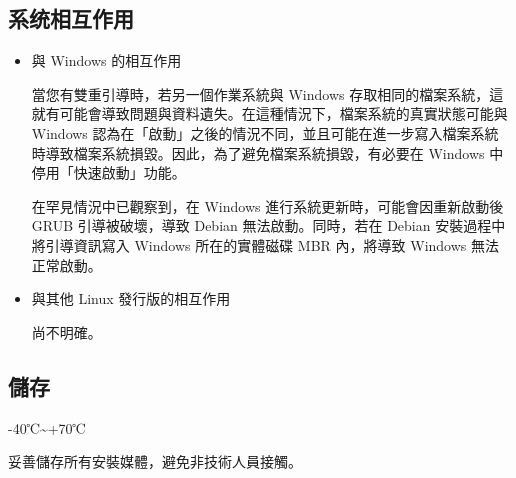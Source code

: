 \documentclass[UTF8]{article}
\begin{document}
\begin{multicols*}{3}


	 
	 


	\begin{tcolorbox}
	\section*{系统相互作用}
	\end{tcolorbox}
	\begin{itemize}[leftmargin=*]
		\setlength{\parindent}{0pt}

		\item 與 Windows 的相互作用

		當您有雙重引導時，若另一個作業系統與 Windows 存取相同的檔案系統，這就有可能會導致問題與資料遺失。在這種情況下，檔案系統的真實狀態可能與 Windows 認為在「啟動」之後的情況不同，並且可能在進一步寫入檔案系統時導致檔案系統損毀。因此，為了避免檔案系統損毀，有必要在 Windows 中停用「快速啟動」功能。

		在罕見情況中已觀察到，在 Windows 進行系統更新時，可能會因重新啟動後 GRUB 引導被破壞，導致 Debian 無法啟動。同時，若在 Debian 安裝過程中將引導資訊寫入 Windows 所在的實體磁碟 MBR 內，將導致 Windows 無法正常啟動。

		\item 與其他 Linux 發行版的相互作用

		尚不明確。

	\end{itemize}


	\begin{tcolorbox}
	\section*{儲存}
	\end{tcolorbox}

	-40℃\textasciitilde +70℃

	妥善儲存所有安裝媒體，避免非技術人員接觸。


\end{multicols*}
\end{document}
